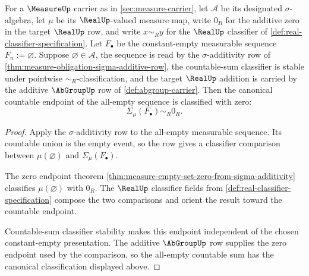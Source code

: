 \begin{theorem}
\label{thm:measure-countable-zero-tail-canonical}
For a $\MeasureUp$ carrier as in \autoref{sec:measure-carrier}, let $\mathcal{A}$ be its designated $\sigma$-algebra, let $\mu$ be its $\RealUp$-valued measure map, write $0_R$ for the additive zero in the target $\RealUp$ row, and write $x\sim_R y$ for the $\RealUp$ classifier of \autoref{def:real-classifier-specification}. Let $F_\bullet$ be the constant-empty measurable sequence $F_n:=\varnothing$. Suppose $\varnothing\in\mathcal{A}$, the sequence is read by the $\sigma$-additivity row of \autoref{thm:measure-obligation-sigma-additive-row}, the countable-sum classifier is stable under pointwise $\sim_R$-classification, and the target $\RealUp$ addition is carried by the additive $\AbGroupUp$ row of \autoref{def:abgroup-carrier}. Then the canonical countable endpoint of the all-empty sequence is classified with zero:
$$
\Sigma_\mu(F_\bullet)\sim_R0_R.
$$
\end{theorem}
\begin{proof}
Apply the $\sigma$-additivity row to the all-empty measurable sequence. Its countable union is the empty event, so the row gives a classifier comparison between $\mu(\varnothing)$ and $\Sigma_\mu(F_\bullet)$.

The zero endpoint theorem \autoref{thm:measure-empty-set-zero-from-sigma-additivity} classifies $\mu(\varnothing)$ with $0_R$. The $\RealUp$ classifier fields from \autoref{def:real-classifier-specification} compose the two comparisons and orient the result toward the countable endpoint.

Countable-sum classifier stability makes this endpoint independent of the chosen constant-empty presentation. The additive $\AbGroupUp$ row supplies the zero endpoint used by the comparison, so the all-empty countable sum has the canonical classification displayed above.
\end{proof}

